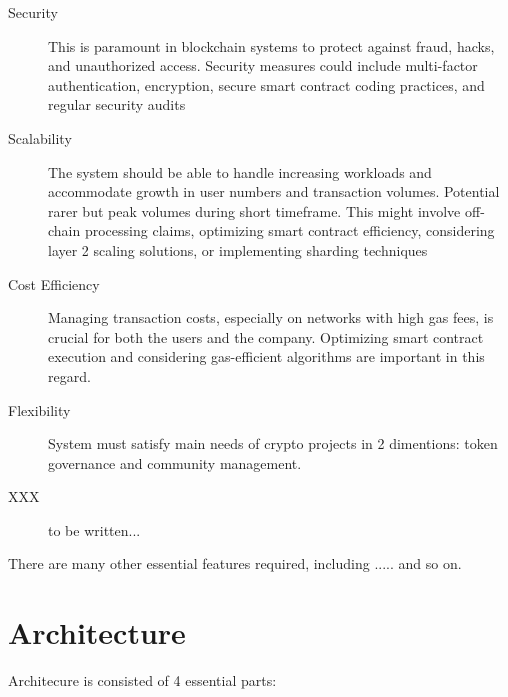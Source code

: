 \documentclass[12pt,oneside]{article}
\begin{document}
\begin{description}
  \item[Security]
  This is paramount in blockchain systems to protect against fraud, hacks,
   and unauthorized access. Security measures could include multi-factor authentication, 
  encryption, secure smart contract coding practices, and regular security audits

  \item[Scalability]
  The system should be able to handle increasing workloads and 
  accommodate growth in user numbers and transaction volumes. Potential rarer but peak volumes during short timeframe.  
  This might involve off-chain processing claims, optimizing smart contract efficiency,
  considering layer 2 scaling solutions, or implementing sharding techniques

  \item[Cost Efficiency]
  Managing transaction costs, especially on networks with high gas fees, 
  is crucial for both the users and the company. 
  Optimizing smart contract execution and considering gas-efficient 
  algorithms are important in this regard.

  \item[Flexibility]
  System must satisfy main needs of crypto projects in 2 dimentions: 
  token governance and community management.

  \item[XXX]
  to be written...

\end{description}

There are many other essential features required, including
..... and so on.

\section{Architecture}

Architecure is consisted of 4 essential parts:
\end{document}
